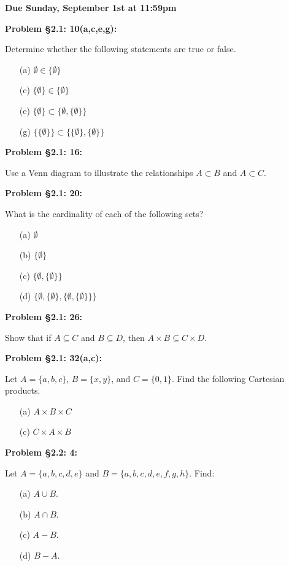 \documentclass{article}
\newenvironment{problem}[1]
    {\begin{mdframed}[default]
    \textbf{Problem #1:}
    }
    {\end{mdframed}
    }
\begin{document}
\textbf{Due Sunday, September 1st at 11:59pm}

\begin{problem}{\S 2.1: 10(a,c,e,g)}
Determine whether the following statements are true or false.
\begin{enumerate}
    \item[(a)] $\emptyset \in \{ \emptyset \}$
    \item[(c)] $\{ \emptyset \} \in \{ \emptyset \}$
    \item[(e)] $\{ \emptyset \} \subset \{ \emptyset, \{ \emptyset \} \}$
    \item[(g)] $\{ \{ \emptyset \} \} \subset \{ \{ \emptyset \}, \{ \emptyset \} \}$
\end{enumerate}
\end{problem}

\begin{problem}{\S 2.1: 16}
Use a Venn diagram to illustrate the relationships $A \subset B$ and $A \subset C$.
\end{problem}

\begin{problem}{\S 2.1: 20}
What is the cardinality of each of the following sets?
\begin{enumerate}
    \item[(a)] $\emptyset$
    \item[(b)] $\{ \emptyset \}$
    \item[(c)] $\{ \emptyset, \{ \emptyset \} \}$
    \item[(d)] $\{ \emptyset, \{ \emptyset \}, \{ \emptyset, \{ \emptyset \} \} \}$
\end{enumerate}
\end{problem}

\begin{problem}{\S 2.1: 26}
Show that if $A \subseteq C$ and $B \subseteq D$, then $A \times B \subseteq C \times D.$
\end{problem}

\begin{problem}{\S 2.1: 32(a,c)}
Let $A = \{ a, b, c \}$, $B = \{ x, y \}$, and $C = \{ 0, 1 \}$. Find the following Cartesian products.
\begin{enumerate}
    \item[(a)] $A \times B \times C$ \item[(c)] $C \times A \times B$
\end{enumerate}
\end{problem}

\begin{problem}{\S 2.2: 4}
Let $A = \{ a, b, c, d, e \}$ and $B = \{ a, b, c, d, e, f, g, h \}$. Find:
\begin{enumerate}
    \item[(a)] $A \cup B$.
    \item[(b)] $A \cap B$.
    \item[(c)] $A - B$.
    \item[(d)] $B - A$.
\end{enumerate}
\end{problem}
\end{document}
